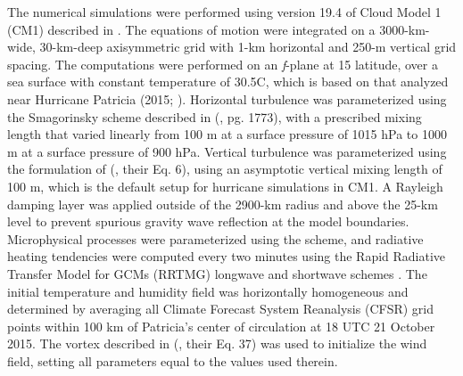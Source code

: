 \documentclass{ametsoc}
\begin{document}
The numerical simulations were performed using version 19.4 of Cloud Model 1 (CM1) described in \cite{BryanRotunno2009}.
The equations of motion were integrated on a 3000-km-wide, 30-km-deep axisymmetric grid with 1-km horizontal and 250-m vertical grid spacing.
The computations were performed on an \textit{f}-plane at 15 latitude, over a sea surface with constant temperature of 30.5\textdegree C, which is based on that analyzed near Hurricane Patricia (2015; \citeauthor{Kimberlainetal2016} \citeyear{Kimberlainetal2016}).
Horizontal turbulence was parameterized using the Smagorinsky scheme described in \citeauthor{BryanRotunno2009} (\citeyear{BryanRotunno2009}, pg. 1773), with a prescribed mixing length that varied linearly from 100 m at a surface pressure of 1015 hPa to 1000 m at a surface pressure of 900 hPa.
Vertical turbulence was parameterized using the formulation of \citeauthor{MarkowskiBryan2016} (\citeyear{MarkowskiBryan2016}, their Eq. 6), using an asymptotic vertical mixing length of 100 m, which is the default setup for hurricane simulations in CM1.
A Rayleigh damping layer was applied outside of the 2900-km radius and above the 25-km level to prevent spurious gravity wave reflection at the model boundaries.
Microphysical processes were parameterized using the \cite{Thompson} scheme, and radiative heating tendencies were computed every two minutes using the Rapid Radiative Transfer Model for GCMs (RRTMG) longwave and shortwave schemes \citep{Iacono}.
The initial temperature and humidity field was horizontally homogeneous and determined by averaging all Climate Forecast System Reanalysis (CFSR) grid points within 100 km of Patricia's center of circulation at 18 UTC 21 October 2015.
The vortex described in \citeauthor{RotunnoEmanuel1987} (\citeyear{RotunnoEmanuel1987}, their Eq. 37) was used to initialize the wind field, setting all parameters equal to the values used therein.
\end{document}
